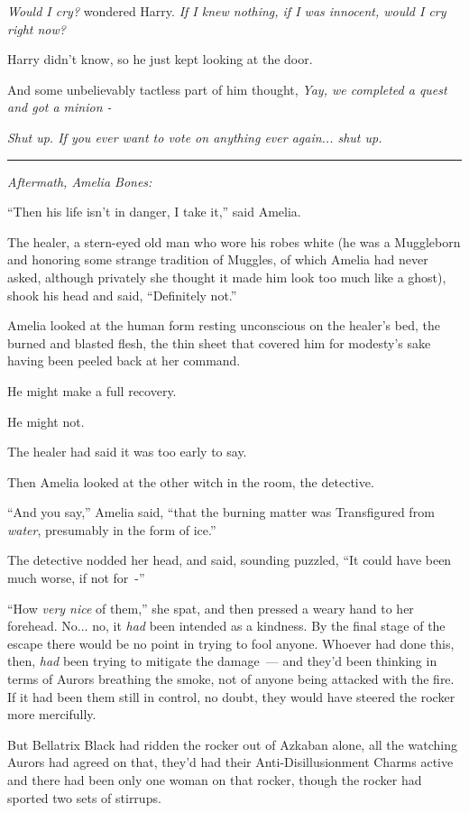 \emph{Would I cry?} wondered Harry. \emph{If I knew nothing, if I was innocent, would I cry right now?}

Harry didn't know, so he just kept looking at the door.

And some unbelievably tactless part of him thought, \emph{Yay, we completed a quest and got a minion -}

\emph{Shut up. If you ever want to vote on anything ever again... shut up.}

\begin{center}\rule{3in}{0.4pt}\end{center}

\emph{Aftermath, Amelia Bones:}

``Then his life isn't in danger, I take it,'' said Amelia.

The healer, a stern-eyed old man who wore his robes white (he was a Muggleborn and honoring some strange tradition of Muggles, of which Amelia had never asked, although privately she thought it made him look too much like a ghost), shook his head and said, ``Definitely not.''

Amelia looked at the human form resting unconscious on the healer's bed, the burned and blasted flesh, the thin sheet that covered him for modesty's sake having been peeled back at her command.

He might make a full recovery.

He might not.

The healer had said it was too early to say.

Then Amelia looked at the other witch in the room, the detective.

``And you say,'' Amelia said, ``that the burning matter was Transfigured from \emph{water}, presumably in the form of ice.''

The detective nodded her head, and said, sounding puzzled, ``It could have been much worse, if not for~-''

``How \emph{very nice} of them,'' she spat, and then pressed a weary hand to her forehead. No... no, it \emph{had} been intended as a kindness. By the final stage of the escape there would be no point in trying to fool anyone. Whoever had done this, then, \emph{had} been trying to mitigate the damage~--- and they'd been thinking in terms of Aurors breathing the smoke, not of anyone being attacked with the fire. If it had been them still in control, no doubt, they would have steered the rocker more mercifully.

But Bellatrix Black had ridden the rocker out of Azkaban alone, all the watching Aurors had agreed on that, they'd had their Anti-Disillusionment Charms active and there had been only one woman on that rocker, though the rocker had sported two sets of stirrups.

